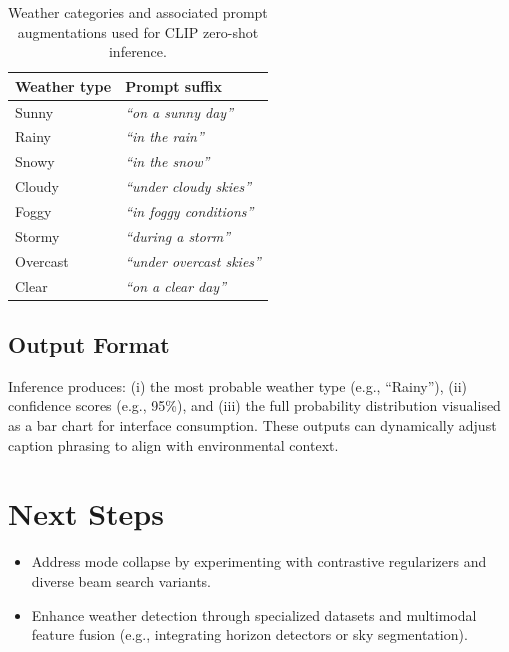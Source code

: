 \documentclass[10pt,twocolumn]{article}
\begin{document}
\begin{table}[h]
    \centering
    \caption{Weather categories and associated prompt augmentations used for CLIP zero-shot inference.}
    \label{tab:weather-prompts}
    \begin{tabular}{ll}
        \toprule
        Weather type & Prompt suffix \\
        \midrule
        Sunny   & \textit{``on a sunny day''} \\
        Rainy   & \textit{``in the rain''} \\
        Snowy   & \textit{``in the snow''} \\
        Cloudy  & \textit{``under cloudy skies''} \\
        Foggy   & \textit{``in foggy conditions''} \\
        Stormy  & \textit{``during a storm''} \\
        Overcast& \textit{``under overcast skies''} \\
        Clear   & \textit{``on a clear day''} \\
        \bottomrule
    \end{tabular}
\end{table}

\subsection{Output Format}
Inference produces: (i) the most probable weather type (e.g., ``Rainy''), (ii) confidence scores (e.g., 95\%), and (iii) the full probability distribution visualised as a bar chart for interface consumption. These outputs can dynamically adjust caption phrasing to align with environmental context.

\section{Next Steps}
\begin{itemize}[leftmargin=1.5em]
    \item Address mode collapse by experimenting with contrastive regularizers and diverse beam search variants.
    \item Enhance weather detection through specialized datasets and multimodal feature fusion (e.g., integrating horizon detectors or sky segmentation).
\end{itemize}
\end{document}
